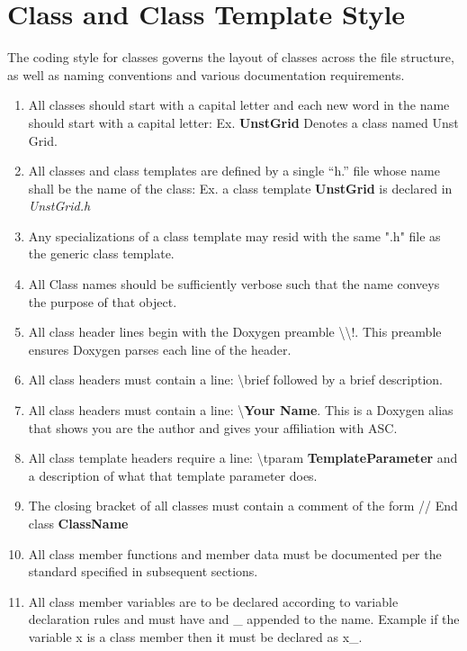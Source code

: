 \documentclass[letterpaper]{article}
\begin{document}
\section{Class and Class Template Style}
The coding style for classes governs the layout of classes across the file structure, as well as naming conventions and various documentation requirements.  
\begin{enumerate}
 \item All classes should start with a capital letter and each new word in the name should start with a capital letter: Ex. \textbf{UnstGrid} Denotes a class named Unst Grid.  
\item All classes and class templates are defined by a single ``h.'' file whose name shall be the name of the class: Ex. a class template \textbf{UnstGrid} is declared in \textit{UnstGrid.h}
\item Any specializations of a class template may resid with the same ".h" file as the generic class template. 
\item All Class names should be sufficiently verbose such that the name conveys the purpose of that object.  
\item All class header lines begin with the Doxygen preamble \textbackslash\textbackslash !.  This preamble ensures Doxygen parses each line of the header.  
\item All class headers must contain a line: \textbackslash brief followed by a brief description.   
\item All class headers must contain a line: \textbackslash \textbf{Your Name}.  This is a Doxygen alias that shows you are the author and gives your affiliation with ASC.  
\item All class template headers require a line: \textbackslash tparam \textbf{TemplateParameter} and a description of what that template parameter does.
\item The closing bracket of all classes must contain a comment of the form // End class \textbf{ClassName}
\item All class member functions and member data must be documented per the standard specified in subsequent sections.  
\item All class member variables are to be declared according to variable declaration rules and must have and \_ appended to the name.  Example if the variable x is a class member then it must be declared as x\_. 
\end{enumerate}
\end{document}
